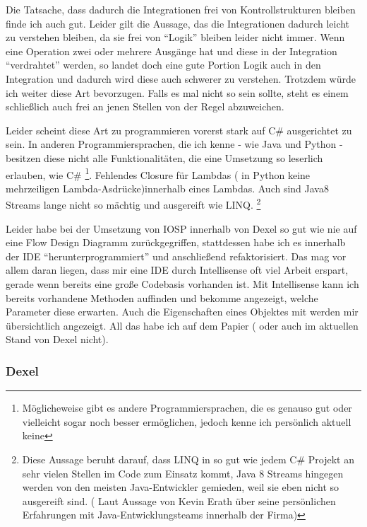 Die Tatsache, dass dadurch die Integrationen frei von Kontrollstrukturen bleiben finde ich auch gut. 
Leider gilt die Aussage, das die Integrationen dadurch leicht zu verstehen bleiben, da sie frei von \enquote{Logik} bleiben leider nicht immer. Wenn eine Operation zwei oder mehrere Ausgänge hat und diese in der Integration \enquote{verdrahtet} werden, so landet doch eine gute Portion Logik auch in den Integration und dadurch wird diese auch schwerer zu verstehen. 
Trotzdem würde ich weiter diese Art bevorzugen. Falls es mal nicht so sein sollte, steht es einem schließlich auch frei an jenen Stellen von der Regel abzuweichen.


Leider scheint diese Art zu programmieren  vorerst stark auf C\# ausgerichtet zu sein. In anderen Programmiersprachen, die ich kenne - wie Java und Python - besitzen diese nicht alle Funktionalitäten, die eine Umsetzung so leserlich erlauben, wie C\# \footnote{Möglicheweise gibt es andere Programmiersprachen, die es genauso gut oder vielleicht sogar noch besser ermöglichen, jedoch kenne ich persönlich aktuell keine }.
Fehlendes Closure für Lambdas ( in Python keine mehrzeiligen Lambda-Asdrücke)innerhalb eines Lambdas. 
Auch sind Java8 Streams lange nicht so mächtig und ausgereift wie LINQ. \footnote{Diese Aussage beruht darauf, dass LINQ in so gut wie jedem C\# Projekt an sehr vielen Stellen im Code zum Einsatz kommt, Java 8 Streams hingegen werden von den meisten Java-Entwickler gemieden, weil sie eben nicht so ausgereift sind. ( Laut Aussage von Kevin Erath über seine persönlichen Erfahrungen mit Java-Entwicklungsteams innerhalb der Firma)}

Leider habe bei der Umsetzung von IOSP innerhalb von Dexel so gut wie nie auf eine Flow Design Diagramm zurückgegriffen, stattdessen habe ich es innerhalb der IDE \enquote{herunterprogrammiert} und anschließend refaktorisiert. Das mag vor allem daran liegen, dass mir eine IDE durch Intellisense oft viel Arbeit erspart, gerade wenn bereits eine große Codebasis vorhanden ist.
Mit Intellisense kann ich bereits vorhandene Methoden auffinden und bekomme angezeigt, welche Parameter diese erwarten.
Auch die Eigenschaften eines Objektes mit werden mir übersichtlich angezeigt.
All das habe ich auf dem Papier ( oder auch im aktuellen Stand von Dexel nicht).



\subsubsection{Dexel}

